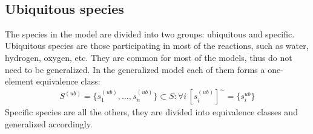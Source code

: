 \documentclass[10pt]{bmc_article}
\newenvironment{bmcformat}{\baselineskip20pt\sloppy\setboolean{publ}{false}}{\baselineskip20pt\sloppy}
\begin{document}
\begin{bmcformat}
\begin{align*}
\end{align*}

\subsection*{Ubiquitous species}
The species in the model are divided into two groups: ubiquitous and specific. Ubiquitous species are those participating in most of the reactions, such as water, hydrogen, oxygen, etc. They are common for most of the models, thus do not need to be generalized. In the generalized model each of them forms a one-element equivalence class:
\begin{align*}
S^{(ub)} = \{s^{(ub)}_1, \ldots, s^{(ub)}_{\breve{n}}\} \subset S: \forall i\,[s^{(ub)}_i]^{\sim} = \{s^{ub}_i\}
\end{align*}
 Specific species are all the others, they are divided into equivalence classes and generalized accordingly.  


\end{bmcformat}
\end{document}

